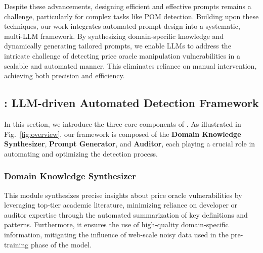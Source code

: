 Despite these advancements, designing efficient and effective prompts remains a challenge, particularly for complex tasks like POM detection. Building upon these techniques, our work integrates automated prompt design into a systematic, multi-LLM framework. By synthesizing domain-specific knowledge and dynamically generating tailored prompts, we enable LLMs to address the intricate challenge of detecting price oracle manipulation vulnerabilities in a scalable and automated manner. This eliminates reliance on manual intervention, achieving both precision and efficiency.


\subsection{\tool: LLM-driven Automated Detection Framework}
In this section, we introduce the three core components of \tool. As illustrated in Fig.~\ref{fig:overview}, our framework is composed of the \textbf{Domain Knowledge Synthesizer}, \textbf{Prompt Generator}, and \textbf{Auditor}, each playing a crucial role in automating and optimizing the detection process.



\subsubsection{Domain Knowledge Synthesizer}
This module synthesizes precise insights about price oracle vulnerabilities by leveraging top-tier academic literature, minimizing reliance on developer or auditor expertise through the automated summarization of key definitions and patterns.
Furthermore, it ensures the use of high-quality domain-specific information, mitigating the influence of web-scale noisy data used in the pre-training phase of the model.

